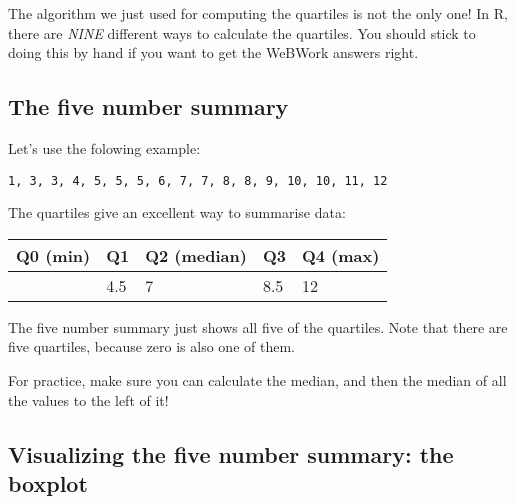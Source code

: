 \documentclass[
  letterpaper,
  DIV=11,
  numbers=noendperiod]{scrreprt}
\begin{document}
\begin{tcolorbox}[enhanced jigsaw, toptitle=1mm, colbacktitle=quarto-callout-warning-color!10!white, breakable, leftrule=.75mm, left=2mm, opacityback=0, colframe=quarto-callout-warning-color-frame, rightrule=.15mm, toprule=.15mm, bottomtitle=1mm, titlerule=0mm, title=\textcolor{quarto-callout-warning-color}{\faExclamationTriangle}\hspace{0.5em}{Warning}, arc=.35mm, colback=white, bottomrule=.15mm, opacitybacktitle=0.6, coltitle=black]

The algorithm we just used for computing the quartiles is not the only
one! In R, there are \emph{NINE} different ways to calculate the
quartiles. You should stick to doing this by hand if you want to get the
WeBWork answers right.

\end{tcolorbox}

\hypertarget{the-five-number-summary}{%
\subsection{The five number summary}\label{the-five-number-summary}}

Let's use the folowing example:

\begin{verbatim}
1, 3, 3, 4, 5, 5, 5, 6, 7, 7, 8, 8, 9, 10, 10, 11, 12
\end{verbatim}

The quartiles give an excellent way to summarise data:

\begin{longtable}[]{@{}lllll@{}}
\toprule\noalign{}
Q0 (min) & Q1 & Q2 (median) & Q3 & Q4 (max) \\
\midrule\noalign{}
\endhead
\bottomrule\noalign{}
\endlastfoot
1 & 4.5 & 7 & 8.5 & 12 \\
\end{longtable}

The five number summary just shows all five of the quartiles. Note that
there are five quartiles, because zero is also one of them.

For practice, make sure you can calculate the median, and then the
median of all the values to the left of it!

\hypertarget{visualizing-the-five-number-summary-the-boxplot}{%
\subsection{Visualizing the five number summary: the
boxplot}\label{visualizing-the-five-number-summary-the-boxplot}}
\end{document}
